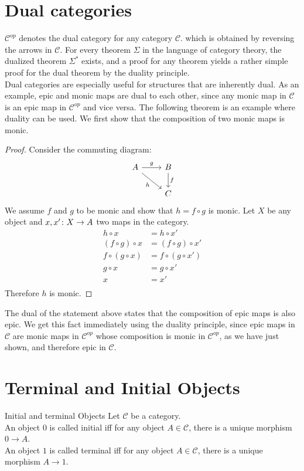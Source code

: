 \section {Dual categories}

$\mathscr{C}^{op}$ denotes the dual category for any category $\mathscr{C}$.
which is obtained by reversing the arrows in $\mathscr{C}$.
For every theorem $\Sigma$ in the language of category theory,
the dualized theorem $\Sigma^*$ exists,
and a proof for any theorem yields a rather simple proof for the dual theorem by the duality principle.\\
Dual categories are especially useful for structures that are inherently dual.
As an example, epic and monic maps are dual to each other, since any monic map in $\mathscr{C}$
is an epic map in $\mathscr{C}^{op}$ and vice versa.
The following theorem is an example where duality can be used.
We first show that the composition of two monic maps is monic.
\begin{proof}
  Consider the commuting diagram:
  \[
    \begin{tikzcd}
      A \arrow[dr, swap, "h"] \arrow{r}{g} & B \arrow{d}{f} \\
      & C
    \end{tikzcd}
  \]
  We assume $f$ and $g$ to be monic and show that $h = f \circ g $ is monic.
  Let $X$ be any object and $x, x' \from X \to A$ two maps in the category.
  \begin{align*}
    h \circ x &= h \circ x' \\
    (f \circ g) \circ x &= (f \circ g) \circ x' \\
    f \circ (g \circ x) &= f \circ (g \circ x') \\
    g \circ x &= g \circ x' \\
    x &= x' \\
  \end{align*}
  Therefore $h$ is monic.
\end{proof}
The dual of the statement above states that the composition of epic maps is also epic.
We get this fact immediately using the duality principle, since epic maps in $\mathscr{C}$
are monic maps in $\mathscr{C}^{op}$ whose composition is monic in $\mathscr{C}^{op}$, as we
have just shown, and therefore epic in $\mathscr{C}$.

\section {Terminal and Initial Objects}
\begin {definition}{Initial and terminal Objects}
  Let $\mathscr{C}$ be a category.\\
  An object $0$ is called initial  iff for any object $A \in \mathscr{C}$,
  there is a unique morphism $0 \to A$.\\
  An object $1$ is called terminal iff for any object $A \in \mathscr{C}$,
  there is a unique morphism $A \to 1$.
\end {definition}

